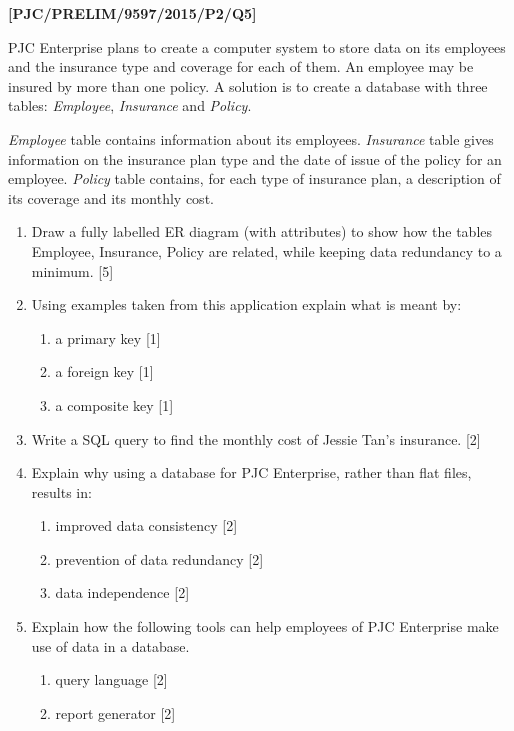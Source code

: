 \item \textbf{{[}PJC/PRELIM/9597/2015/P2/Q5{]} }

PJC Enterprise plans to create a computer system to store data on
its employees and the insurance type and coverage for each of them.
An employee may be insured by more than one policy. A solution is
to create a database with three tables: \emph{Employee}, \emph{Insurance}
and \emph{Policy}. 

\emph{Employee} table contains information about its employees. \emph{Insurance}
table gives information on the insurance plan type and the date of
issue of the policy for an employee. \emph{Policy} table contains,
for each type of insurance plan, a description of its coverage and
its monthly cost. 
\begin{enumerate}
\item Draw a fully labelled ER diagram (with attributes) to show how the
tables Employee, Insurance, Policy are related, while keeping data
redundancy to a minimum. \hfill{}{[}5{]}
\item Using examples taken from this application explain what is meant by:
\begin{enumerate}
\item a primary key \hfill{}{[}1{]}
\item a foreign key \hfill{} {[}1{]}
\item a composite key \hfill{}{[}1{]}
\end{enumerate}
\item Write a SQL query to find the monthly cost of Jessie Tan\textquoteright s
insurance. \hfill{}{[}2{]}
\item Explain why using a database for PJC Enterprise, rather than flat
files, results in: 
\begin{enumerate}
\item improved data consistency \hfill{}{[}2{]}
\item prevention of data redundancy \hfill{}{[}2{]}
\item data independence \hfill{} {[}2{]}
\end{enumerate}
\item Explain how the following tools can help employees of PJC Enterprise
make use of data in a database.
\begin{enumerate}
\item query language\hfill{} {[}2{]}
\item report generator \hfill{}{[}2{]}
\end{enumerate}
\end{enumerate}